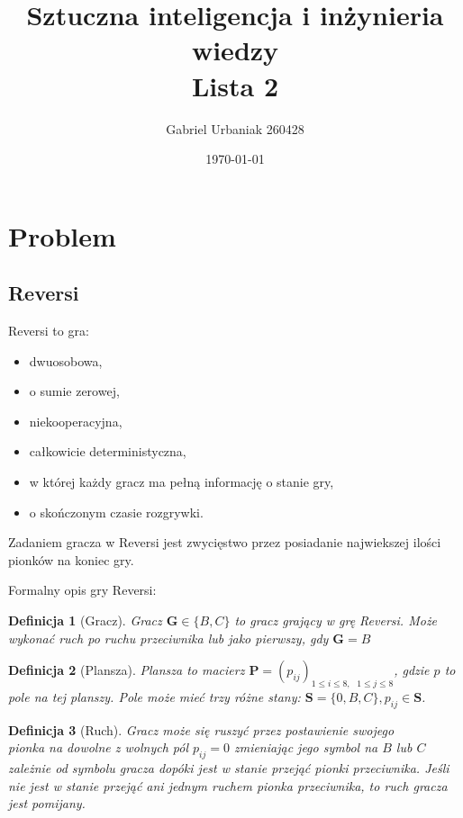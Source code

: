\documentclass[12pt, a4paper]{article}
\title{Sztuczna inteligencja i inżynieria wiedzy \\ Lista 2}
\author{Gabriel Urbaniak 260428}
\date{\today}
\newtheorem{definition}{Definicja}
\begin{document}
\maketitle

\section{Problem}

\subsection{Reversi}
Reversi to gra:
\begin{itemize}
    \item dwuosobowa,
    \item o sumie zerowej,
    \item niekooperacyjna,
    \item całkowicie deterministyczna,
    \item w której każdy gracz ma pełną informację o stanie gry,
    \item o skończonym czasie rozgrywki.
\end{itemize}

Zadaniem gracza w Reversi jest zwycięstwo przez posiadanie najwiekszej ilości pionków na koniec gry.

Formalny opis gry Reversi:
\begin{definition}[Gracz]
    Gracz $\boldsymbol{G} \in \{B, C\}$ to gracz grający w grę Reversi.
    Może wykonać ruch po ruchu przeciwnika lub jako pierwszy, gdy $\boldsymbol{G} = B$
\end{definition}

\begin{definition}[Plansza]
    Plansza to macierz $\boldsymbol{P} = (p_{ij})_{1 \le i \le 8,\text{ } 1 \le j \le 8}$, gdzie $p$ to pole na tej planszy.
    Pole może mieć trzy różne stany: $ \boldsymbol{S} = \{0, B, C\}, p_{ij} \in \boldsymbol{S} $.
\end{definition}

\begin{definition}[Ruch]
    Gracz może się ruszyć przez postawienie swojego \\ pionka na dowolne z wolnych pól $p_{ij} = 0$
    zmieniając jego symbol na $B$ lub $C$ zależnie od symbolu gracza dopóki jest w stanie przejąć pionki przeciwnika.
    Jeśli nie jest w stanie przejąć ani jednym ruchem pionka przeciwnika, to ruch gracza jest pomijany.
\end{definition}
\end{document}
